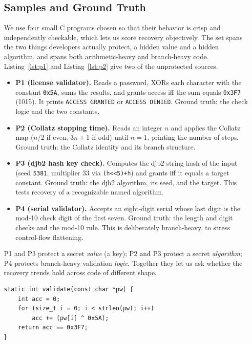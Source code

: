 \documentclass[conference]{IEEEtran}
\begin{document}
\subsection{Samples and Ground Truth}
We use four small C programs chosen so that their behavior is crisp and
independently checkable, which lets us score recovery objectively. The set spans
the two things developers actually protect, a hidden value and a hidden
algorithm, and spans both arithmetic-heavy and branch-heavy code.
Listing~\ref{lst:p1} and Listing~\ref{lst:p2} give two of the unprotected sources.
\begin{itemize}
\item \textbf{P1 (license validator).} Reads a password, XORs each character with
the constant \texttt{0x5A}, sums the results, and grants access iff the sum
equals \texttt{0x3F7} (1015). It prints \texttt{ACCESS GRANTED} or
\texttt{ACCESS DENIED}. Ground truth: the check logic and the two constants.
\item \textbf{P2 (Collatz stopping time).} Reads an integer $n$ and applies the
Collatz map ($n/2$ if even, $3n+1$ if odd) until $n=1$, printing the number of
steps. Ground truth: the Collatz identity and its branch structure.
\item \textbf{P3 (djb2 hash key check).} Computes the djb2 string hash of the
input (seed \texttt{5381}, multiplier $33$ via \texttt{(h<<5)+h}) and grants iff
it equals a target constant. Ground truth: the djb2 algorithm, its seed, and the
target. This tests recovery of a recognizable named algorithm.
\item \textbf{P4 (serial validator).} Accepts an eight-digit serial whose last
digit is the mod-10 check digit of the first seven. Ground truth: the length and
digit checks and the mod-10 rule. This is deliberately branch-heavy, to stress
control-flow flattening.
\end{itemize}
P1 and P3 protect a secret \emph{value} (a key); P2 and P3 protect a secret
\emph{algorithm}; P4 protects branch-heavy validation \emph{logic}. Together they
let us ask whether the recovery trends hold across code of different shape.

\begin{lstlisting}[style=ccode,caption={P1 license validator (unprotected).},label={lst:p1}]
static int validate(const char *pw) {
    int acc = 0;
    for (size_t i = 0; i < strlen(pw); i++)
        acc += (pw[i] ^ 0x5A);
    return acc == 0x3F7;
}
\end{lstlisting}
\end{document}
